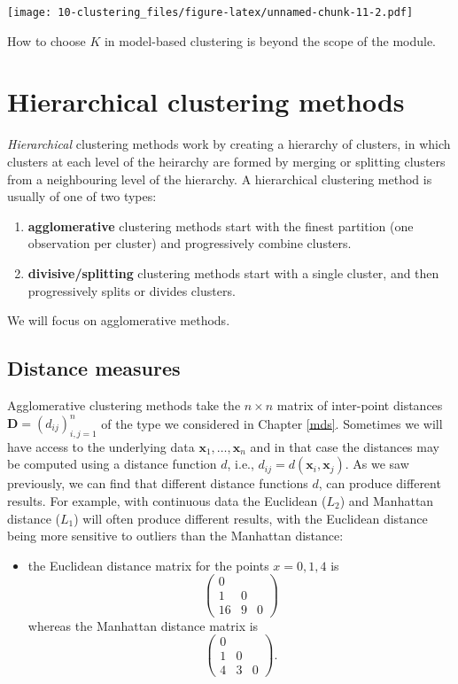 \documentclass[
]{book}
\providecommand{\tightlist}{%
  \setlength{\itemsep}{0pt}\setlength{\parskip}{0pt}}
\theoremstyle{definition}
\theoremstyle{definition}
\theoremstyle{definition}
\theoremstyle{definition}
\theoremstyle{remark}
\begin{document}
\texttt{[image: 10-clustering\_files/figure-latex/unnamed-chunk-11-2.pdf]}

How to choose \(K\) in model-based clustering is beyond the scope of the module.

\section{Hierarchical clustering methods}\label{hierarchical-clustering-methods}

\emph{Hierarchical} clustering methods work by creating a hierarchy of clusters, in which clusters at each level of the heirarchy are formed by merging or splitting clusters from a neighbouring level of the hierarchy. A hierarchical clustering method is usually of one of two types:

\begin{enumerate}
\def\labelenumi{\arabic{enumi}.}
\item
  \textbf{agglomerative} clustering methods start with the finest partition (one observation per cluster) and progressively combine clusters.
\item
  \textbf{divisive/splitting} clustering methods start with a single cluster, and then progressively splits or divides clusters.
\end{enumerate}

We will focus on agglomerative methods.

\subsection{Distance measures}\label{distance-measures}

Agglomerative clustering methods take the \(n \times n\) matrix of inter-point distances \(\mathbf D=(d_{ij})_{i,j=1}^n\) of the type we considered in Chapter \ref{mds}. Sometimes we will have access to the underlying data \(\mathbf x_1, \ldots, \mathbf x_n\) and in that case the distances may be computed using a distance function \(d\), i.e., \(d_{ij}=d(\mathbf x_i, \mathbf x_j)\).
As we saw previously, we can find that different distance functions \(d\), can produce different results. For example, with continuous data the Euclidean (\(L_2\)) and Manhattan distance (\(L_1\)) will often produce different results, with the Euclidean distance being more sensitive to outliers than the Manhattan distance:

\begin{itemize}
\tightlist
\item
  the Euclidean distance matrix for the points \(x=0, 1,4\) is
  \[\begin{pmatrix}0&&\\1&0\\
  16&9&0\end{pmatrix}\]
  whereas the Manhattan distance matrix is
  \[\begin{pmatrix}0&&\\1&0\\
  4&3&0\end{pmatrix}.\]
\end{itemize}
\end{document}
